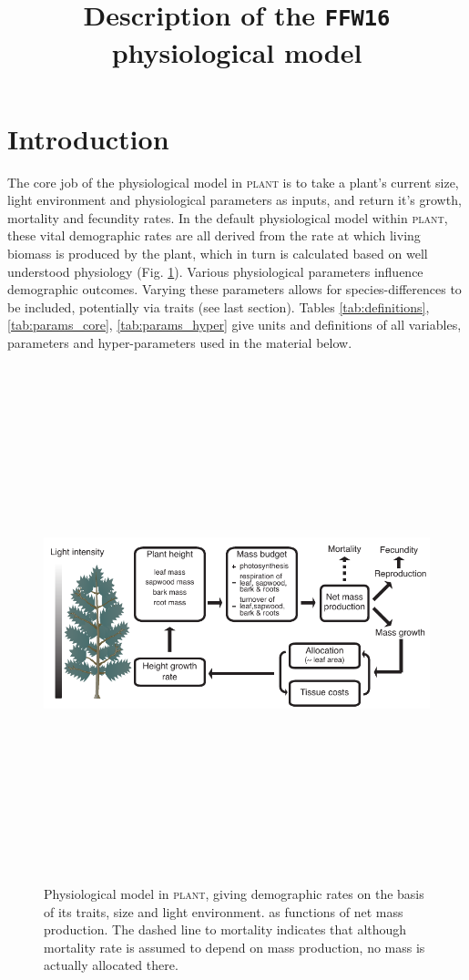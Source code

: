 \documentclass[10pt,twoside]{article}
\title{Description of the \texttt{FFW16} physiological model}
\date{}
\newcommand{\plant}{\textsc{plant}}
\begin{document}
\maketitle

\tableofcontents

\section{Introduction}

The core job of the physiological model in {\plant} is to take a plant's
current size, light environment and physiological parameters as inputs,
and return it's growth, mortality and fecundity rates. In the default
physiological model within {\plant}, these vital demographic rates are all
derived from the rate at which living biomass is produced by the plant,
which in turn is calculated based on well understood physiology (Fig.
\ref{fig:schematic-phys}). Various physiological parameters
influence demographic outcomes. Varying these parameters allows for
species-differences to be included, potentially via traits (see last
section). Tables
\ref{tab:definitions}, \ref{tab:params_core},  \ref{tab:params_hyper} give
 units and definitions of all variables, parameters and hyper-parameters used in
 the material below.

\begin{figure}[h!]
\centering
\includegraphics[width=15cm,height=15cm,keepaspectratio]{../figures/schematic-phys}
\caption{Physiological model in {\plant}, giving
demographic rates on the basis of its traits, size and light environment. as functions of
net mass production. The dashed line to mortality indicates that although mortality rate is assumed to depend on mass production, no
mass is actually allocated there.}
\label{fig:schematic-phys}
\end{figure}
\end{document}
